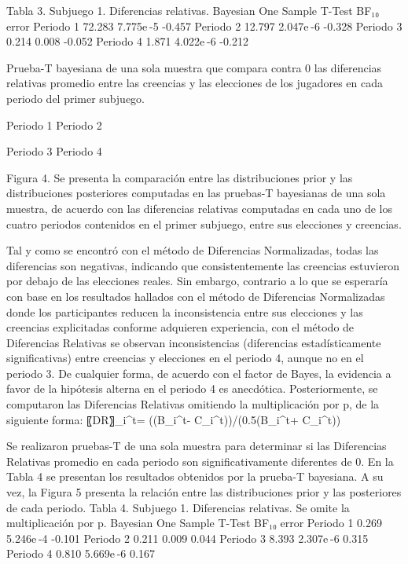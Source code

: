 Tabla 3. Subjuego 1. Diferencias relativas.
Bayesian One Sample T-Test 	
  	BF₁₀ 	error %
Periodo 1 		72.283 		7.775e -5 		-0.457
Periodo 2 		12.797 		2.047e -6 		-0.328
Periodo 3 		0.214 		0.008 		-0.052
Periodo 4 		1.871 		4.022e -6 		-0.212
	
Prueba-T bayesiana de una sola muestra que compara contra 0 las diferencias relativas promedio entre las creencias y las elecciones de los jugadores en cada periodo del primer subjuego.

  
Periodo 1					Periodo 2
  
Periodo 3					Periodo 4

Figura 4. Se presenta la comparación entre las distribuciones prior y las distribuciones posteriores computadas en las pruebas-T bayesianas de una sola muestra, de acuerdo con las diferencias relativas computadas en cada uno de los cuatro periodos contenidos en el primer subjuego, entre sus elecciones y creencias.

Tal y como se encontró con el método de Diferencias Normalizadas, todas las diferencias son negativas, indicando que consistentemente las creencias estuvieron por debajo de las elecciones reales. Sin embargo, contrario a lo que se esperaría con base en los resultados hallados con el método de Diferencias Normalizadas donde los participantes reducen la inconsistencia entre sus elecciones y las creencias explicitadas conforme adquieren experiencia, con el método de Diferencias Relativas se observan inconsistencias (diferencias estadísticamente significativas) entre creencias y elecciones en el periodo 4, aunque no en el periodo 3. De cualquier forma, de acuerdo con el factor de Bayes, la evidencia a favor de la hipótesis alterna en el periodo 4 es anecdótica.
Posteriormente, se computaron las Diferencias Relativas omitiendo la multiplicación por p, de la siguiente forma:
〖DR〗_i^t=  ((B_i^t- C_i^t))/(0.5(B_i^t+ C_i^t))

Se realizaron pruebas-T de una sola muestra para determinar si las Diferencias Relativas promedio en cada periodo son significativamente diferentes de 0. En la Tabla 4 se presentan los resultados obtenidos por la prueba-T bayesiana. A su vez, la Figura 5 presenta la relación entre las distribuciones prior y las posteriores de cada periodo.
Tabla 4. Subjuego 1. Diferencias relativas. Se omite la multiplicación por p.
Bayesian One Sample T-Test 	
  	BF₁₀ 	error %
Periodo 1 		0.269 		5.246e -4 		-0.101 
Periodo 2 		0.211 		0.009 		0.044 
Periodo 3 		8.393 		2.307e -6 		0.315 
Periodo 4 		0.810 		5.669e -6 		0.167 
	
